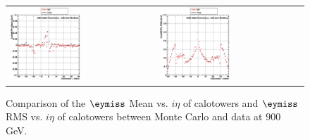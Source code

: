 \begin{figure}[h!]
 \centering
 \begin{tabular}{ll}
  \includegraphics[width=0.5\textwidth]{plots_DataVsMC_MB_900GeV/g_calometPyMean_vs_ieta_900.eps} &
  \includegraphics[width=0.5\textwidth]{plots_DataVsMC_MB_900GeV/g_calometPyRMS_vs_ieta_900.eps} \\
 \end{tabular}
 \caption{\small Comparison of the $\eymiss$ Mean vs. $i\eta$ of calotowers and $\eymiss$ RMS vs. $i\eta$ of calotowers between 
          Monte Carlo and data at $900$ GeV.\label{fig:METy_MeanRMS_vs_ieta_900}}
\end{figure}

\clearpage
